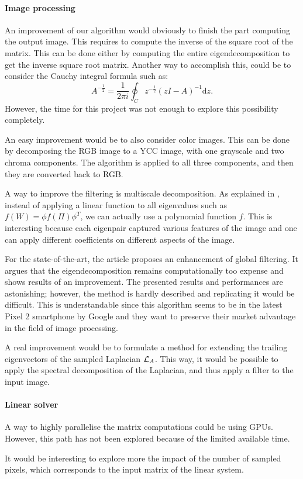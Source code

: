 \paragraph{Image processing}
An improvement of our algorithm would obviously to finish the part computing the output image.
This requires to compute the inverse of the square root of the matrix.
This can be done either by computing the entire eigendecomposition to get the inverse square root matrix.
Another way to accomplish this, could be to consider the Cauchy integral formula such as:
\[A^{-\frac{1}{2}} = \frac{1}{2\pi i} \oint_C z^{-\frac{1}{2}} (zI - A)^{-1} \mathrm{d}z.\]
However, the time for this project was not enough to explore this possibility completely.

An easy improvement would be to also consider color images.
This can be done by decomposing the RGB image to a YCC image, with one grayscale and two chroma components.
The algorithm is applied to all three components, and then they are converted back to RGB.

A way to improve the filtering is multiscale decomposition.
As explained in \cite{talebi_nonlocal_2014}, instead of applying a linear function to all eigenvalues such as \(f(W) = \phi f(\Pi) \phi^T\), we can actually use a polynomial function \(f\).
This is interesting because each eigenpair captured various features of the image and one can apply different coefficients on different aspects of the image.

For the state-of-the-art, the article \cite{talebi_fast_2016} proposes an enhancement of global filtering.
It argues that the eigendecomposition remains computationally too expense and shows results of an improvement.
The presented results and performances are astonishing; however, the method is hardly described and replicating it would be difficult.
This is understandable since this algorithm seems to be in the latest Pixel 2 smartphone by Google and they want to preserve their market advantage in the field of image processing.

A real improvement would be to formulate a method for extending the trailing eigenvectors of the sampled Laplacian \(\operatorname{\mathcal{L}}_A\).
This way, it would be possible to apply the spectral decomposition of the Laplacian, and thus apply a filter to the input image.

\paragraph{Linear solver}
A way to highly parallelise the matrix computations could be using GPUs.
However, this path has not been explored because of the limited available time.

It would be interesting to explore more the impact of the number of sampled pixels, which corresponds to the input matrix of the linear system.
